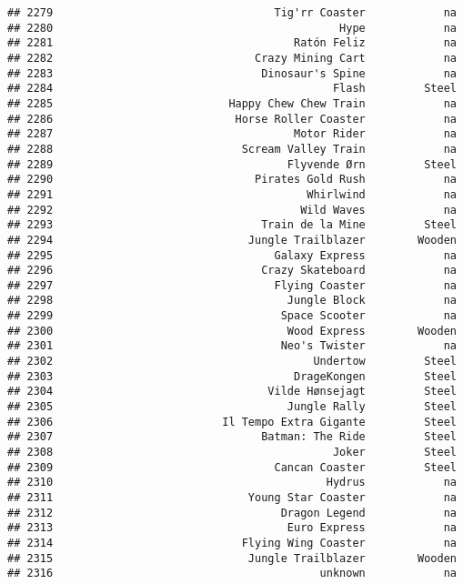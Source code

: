\documentclass[
]{article}
\begin{document}
\begin{verbatim}
## 2279                                  Tig'rr Coaster            na
## 2280                                            Hype            na
## 2281                                     Ratón Feliz            na
## 2282                               Crazy Mining Cart            na
## 2283                                Dinosaur's Spine            na
## 2284                                           Flash         Steel
## 2285                           Happy Chew Chew Train            na
## 2286                            Horse Roller Coaster            na
## 2287                                     Motor Rider            na
## 2288                             Scream Valley Train            na
## 2289                                    Flyvende Ørn         Steel
## 2290                               Pirates Gold Rush            na
## 2291                                       Whirlwind            na
## 2292                                      Wild Waves            na
## 2293                                Train de la Mine         Steel
## 2294                              Jungle Trailblazer        Wooden
## 2295                                  Galaxy Express            na
## 2296                                Crazy Skateboard            na
## 2297                                  Flying Coaster            na
## 2298                                    Jungle Block            na
## 2299                                   Space Scooter            na
## 2300                                    Wood Express        Wooden
## 2301                                   Neo's Twister            na
## 2302                                        Undertow         Steel
## 2303                                     DrageKongen         Steel
## 2304                                 Vilde Hønsejagt         Steel
## 2305                                    Jungle Rally         Steel
## 2306                          Il Tempo Extra Gigante         Steel
## 2307                                Batman: The Ride         Steel
## 2308                                           Joker         Steel
## 2309                                  Cancan Coaster         Steel
## 2310                                          Hydrus            na
## 2311                              Young Star Coaster            na
## 2312                                   Dragon Legend            na
## 2313                                    Euro Express            na
## 2314                             Flying Wing Coaster            na
## 2315                              Jungle Trailblazer        Wooden
## 2316                                         unknown            na

\end{verbatim}
\end{document}
